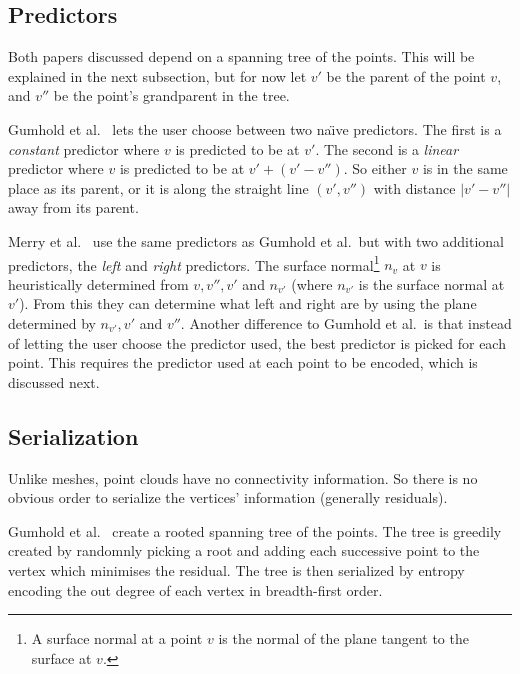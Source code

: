 \documentclass{report}
\begin{document}
\subsection{Predictors}

Both papers discussed depend on a spanning tree of the points. This will be
explained in the next subsection, but for now let $v'$ be the parent of the
point $v$, and $v''$ be the point's grandparent in the tree.

Gumhold et al.~\cite{gumholdcomp} lets the user choose between two na\"{\i}ve
predictors. The first is a \emph{constant} predictor where $v$ is predicted to
be at $v'$. The second is a \emph{linear} predictor where $v$ is predicted to
be at $v' + (v' - v'')$. So either $v$ is in the same place as its parent, or
it is along the straight line $(v', v'')$ with distance $|v'-v''|$ away from
its parent.

Merry et al.~\cite{merrycomp} use the same predictors as Gumhold et al.\ but
with two additional predictors, the \emph{left} and \emph{right}
predictors. The surface normal\footnote{A surface normal at a point $v$ is the
  normal of the plane tangent to the surface at $v$.} $n_v$ at $v$ is
heuristically determined from $v, v'', v'$ and $n_{v'}$ (where $n_{v'}$ is the
surface normal at $v'$). From this they can determine what left and right are
by using the plane determined by $n_{v'}, v'$ and $v''$. Another difference to
Gumhold et al.\ is that instead of letting the user choose the predictor used,
the best predictor is picked for each point. This requires the predictor used
at each point to be encoded, which is discussed next.


\subsection{Serialization}

Unlike meshes, point clouds have no connectivity information. So there is no
obvious order to serialize the vertices' information (generally residuals).

Gumhold et al.~\cite{gumholdcomp} create a rooted spanning tree of the
points. The tree is greedily created by randomnly picking a root and adding
each successive point to the vertex which minimises the residual. The tree is
then serialized by entropy encoding the out degree of each vertex in
breadth-first order.
\end{document}
